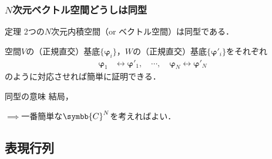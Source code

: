 \documentclass[
    10pt,
    ]{sotsu-beamer}
\begin{document}
\begin{frame}
    [label={frame:finite-dimensional-vector-space-isomorphic}]
    \frametitle{$N$次元ベクトル空間どうしは同型}

    \begin{block}{定理}
        2つの$N$次元内積空間（or ベクトル空間）は同型である．
    \end{block}

    空間$V$の（正規直交）基底$\{\symbf{\varphi}_i\}$，$W$の（正規直交）基底$\{\symbf{\varphi}'_i\}$をそれぞれ
    \begin{align*}
        \symbf{\varphi}_1 &\leftrightarrow \symbf{\varphi}'_1, 
        \quad
        \cdots, 
        \quad
        \symbf{\varphi}_N \leftrightarrow \symbf{\varphi}'_N
    \end{align*}
    のように対応させれば簡単に証明できる．

    \pause

    \begin{alertblock}{同型の意味}
        結局，
    \end{alertblock}

    $\implies$一番簡単な$\symbb{C}^N$を考えればよい．

\end{frame}



\subsection{表現行列}
\end{document}
